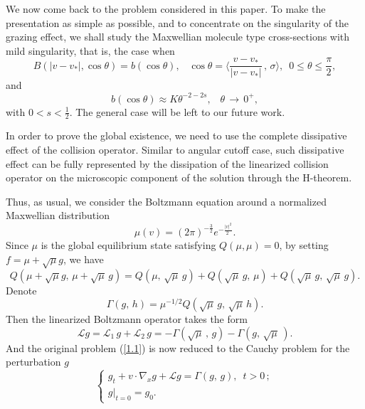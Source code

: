\documentclass{amsart}[12pt, article]
\begin{document}
We now come back to the problem
considered in this paper.
To make the presentation as simple as possible, and  to concentrate  on the
singularity of the grazing effect, we shall study the Maxwellian molecule type cross-sections with mild singularity, that is, the case when
\begin{equation*}\label{singularity-1}
B(|v-v_*|, \cos \theta)=b(\cos \theta),\,\,\,\,\, \cos
\theta=\Big\langle\frac{v-v_*}{|v-v_*|} \, ,\,\sigma\Big\rangle,\,\,\,
0\leq\theta\leq\frac{\pi}{2},
\end{equation*}
and
\begin{equation}\label{singularity}
b(\cos \theta)\approx  K \theta^{-2-2s},\,\,\,\,\,
\theta\,\rightarrow\, 0^+ ,
\end{equation}
with $0<s<\frac12$. The general case will be left to our future work.

In order to prove the global existence, we need to use
the complete dissipative effect of the collision operator. Similar to angular cutoff case, such dissipative effect
can be fully represented by the dissipation of the linearized
collision operator on the microscopic component of the solution
through the  H-theorem.

Thus, as usual, we consider the Boltzmann equation around a
normalized Maxwellian distribution
\[
\mu (v)=(2\pi )^{-\frac{3}{2}}e^{-\frac{|v|^2}{2\,\,}}.
\]
Since $\mu$ is the global equilibrium state satisfying $Q(\mu,
\mu)=0$, by setting $f=\mu+\sqrt{\mu}  g$, we have
\[
Q(\mu+\sqrt{\mu}  g,\, \mu+\sqrt{\mu}\,  g)=Q(\mu,\, \sqrt{\mu}\,g)+
Q(\sqrt{\mu}\,g,\, \mu)+Q(\sqrt{\mu}\,g,\, \sqrt{\mu}\,g).
\]
Denote
\begin{equation*}\label{1.2}
\Gamma(g,\, h)=\mu^{-1/2}Q(\sqrt{\mu}\,g,\, \sqrt{\mu}\,h).
\end{equation*}
Then the linearized Boltzmann operator takes the form
\begin{equation*}\label{1.3}
{{\mathcal L}} g={{\mathcal L}}_1\, g+{{\mathcal L}}_2\, g=-\Gamma(\sqrt{\mu}\,,\, g)- \Gamma(g,\,
\sqrt{\mu}\,).
\end{equation*}
And the original problem (\ref{1.1}) is now reduced to the Cauchy problem
for the perturbation
$g$
\begin{equation}\label{cauchy-problem}
\left\{\begin{array}{l} g_t + v\cdot\nabla_x g + {{\mathcal L}} g=\Gamma(g,\,
g), \,\,\, t>0\,;\\
g|_{t=0}=g_0.\end{array}\right.
\end{equation}
\end{document}
